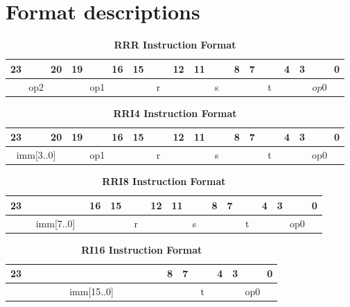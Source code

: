 \section{Format descriptions}

\begin{table}[H]
    \caption{\textbf{RRR Instruction Format}}
    \begin{tabular}{llllllllllllllllllllllll}
       23 & & & 20 & 19 & & & 16 & 15 & & & 12 & 11 & & & 8 & 7 & & & 4 & 3 & & & 0 \\
        \hline
        \multicolumn{4}{|c|}{op2} & \multicolumn{4}{c|}{op1} & \multicolumn{4}{c|}{r} & \multicolumn{4}{c|}{s} & \multicolumn{4}{c|}{t} & \multicolumn{4}{c|}{$op0$}\\
        \hline
    \end{tabular}
\end{table}

\begin{table}[H]
    \caption{\textbf{RRI4 Instruction Format}}
    \begin{tabular}{llllllllllllllllllllllll}
        23 & & & 20 & 19 & & & 16 & 15 & & & 12 & 11 & & & 8 & 7 & & & 4 & 3 & & & 0 \\
        \hline
        \multicolumn{4}{|c|}{imm[3..0]} & \multicolumn{4}{c|}{op1} & \multicolumn{4}{c|}{r} & \multicolumn{4}{c|}{s} & \multicolumn{4}{c|}{t} & \multicolumn{4}{c|}{op0}\\
        \hline
    \end{tabular}
\end{table}

\begin{table}[H]
    \caption{\textbf{RRI8 Instruction Format}}
    \begin{tabular}{llllllllllllllllllllllll}
        23 & & & & & & & 16 & 15 & & & 12 & 11 & & & 8 & 7 & & & 4 & 3 & & & 0 \\
        \hline
        \multicolumn{8}{|c|}{imm[7..0]} & \multicolumn{4}{c|}{r} & \multicolumn{4}{c|}{s} & \multicolumn{4}{c|}{t} & \multicolumn{4}{c|}{op0}\\
        \hline
    \end{tabular}
\end{table}

\begin{table}[H]
    \caption{\textbf{RI16 Instruction Format}}
    \begin{tabular}{llllllllllllllllllllllll}
        23 & & & & & & & & & & & & & & & 8 & 7 & & & 4 & 3 & & & 0 \\
        \hline
        \multicolumn{16}{|c|}{imm[15..0]} & \multicolumn{4}{c|}{t} & \multicolumn{4}{c|}{op0}\\
        \hline
    \end{tabular}
\end{table}

